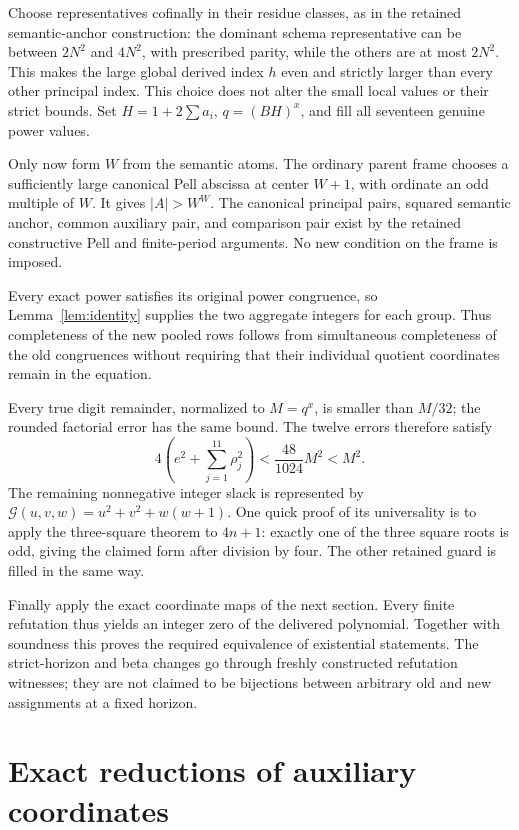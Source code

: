 \documentclass[11pt,letterpaper]{article}
\theoremstyle{definition}\newtheorem{definition}[theorem]{Definition}
\theoremstyle{remark}\newtheorem{remark}[theorem]{Remark}
\newcommand{\G}{\mathcal G}
\begin{document}
Choose representatives cofinally in their residue classes, as in the
retained semantic-anchor construction: the dominant schema representative
can be between \(2N^2\) and \(4N^2\), with prescribed parity, while the
others are at most \(2N^2\). This makes the large global derived index
\(h\) even and strictly larger than every other principal index. This
choice does not alter the small local values or their strict bounds.
Set \(H=1+2\sum a_i\), \(q=(BH)^x\), and fill all seventeen genuine
power values.

Only now form \(W\) from the semantic atoms. The ordinary parent frame
chooses a sufficiently large canonical Pell abscissa at center \(W+1\),
with ordinate an odd multiple of \(W\). It gives \(|A|>W^W\).
The canonical principal pairs, squared semantic anchor, common auxiliary
pair, and comparison pair exist by the retained constructive Pell and
finite-period arguments. No new condition on the frame is imposed.

Every exact power satisfies its original power congruence, so
Lemma~\ref{lem:identity} supplies the two aggregate integers for each
group. Thus completeness of the new pooled rows follows from simultaneous
completeness of the old congruences without requiring that their
individual quotient coordinates remain in the equation.

Every true digit remainder, normalized to \(M=q^x\), is smaller than
\(M/32\); the rounded factorial error has the same bound. The twelve
errors therefore satisfy
\[
4\left(e^2+\sum_{j=1}^{11}\rho_j^2\right)
 <\frac{48}{1024}M^2<M^2.
\]
The remaining nonnegative integer slack is represented by
\(\G(u,v,w)=u^2+v^2+w(w+1)\). One quick proof of its universality is
to apply the three-square theorem to \(4n+1\): exactly one of the
three square roots is odd, giving the claimed form after division by four.
The other retained guard is filled in the same way.

Finally apply the exact coordinate maps of the next section. Every finite
refutation thus yields an integer zero of the delivered polynomial.
Together with soundness this proves the required equivalence of
existential statements. The strict-horizon and beta changes go through
freshly constructed refutation witnesses; they are not claimed to be
bijections between arbitrary old and new assignments at a fixed horizon.

\section{Exact reductions of auxiliary coordinates}
\label{sec:algebra}
\end{document}
